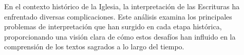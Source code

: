 En el contexto histórico de la Iglesia, la interpretación de las Escrituras ha enfrentado diversas complicaciones. Este análisis examina los principales problemas de interpretación que han surgido en cada etapa histórica, proporcionando una visión clara de cómo estos desafíos han influido en la comprensión de los textos sagrados a lo largo del tiempo.